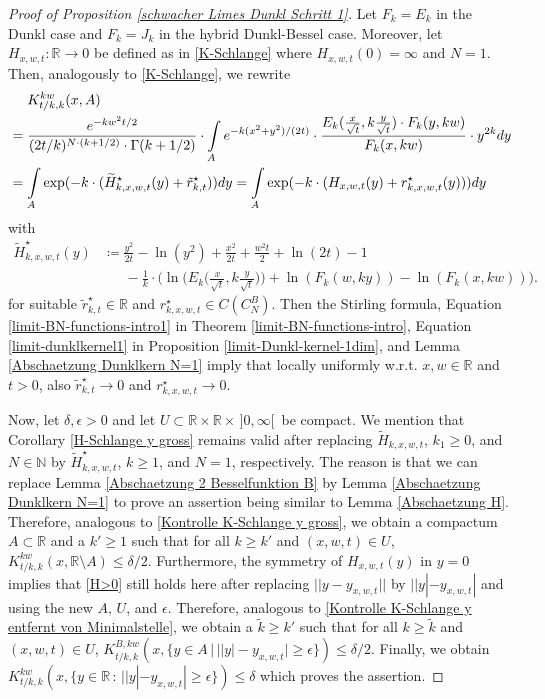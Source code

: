 \documentclass[reqno]{amsart}
\theoremstyle{plain}
\theoremstyle{definition}
\numberwithin{equation}{section}
\newcommand{\R}{\mathbb{R}}
\newcommand{\N}{\mathbb{N}}
\begin{document}
\begin{proof}[Proof of Proposition \ref{schwacher Limes Dunkl Schritt 1}]
Let $F_k=E_k$ in the Dunkl case and $F_k=J_k$ in the hybrid Dunkl-Bessel case.
Moreover, let $H_{x,w,t}:\R \to 0$ be defined as in \eqref{K-Schlange} where $H_{x,w,t}(0)=\infty$ and $N=1$.
Then, analogously to \eqref{K-Schlange}, we rewrite
\begin{align}
&\>\>\>\>\>\>K_{t/k,k}^{kw}(x,A) \notag \\
&=\frac{e^{-kw^2 t/2}}{(2t/k)^{N \cdot (k + 1/2)} \cdot \Gamma(k + 1/2)}
\cdot \int\limits_A e^{-k(x^2+y^2)/(2t)} \cdot \frac{E_k(\frac{x}{\sqrt t},k\frac{y}{\sqrt{t}}) \cdot F_k(y,kw)}{F_k(x,kw)} \cdot y^{2k} dy \notag\\ 
&=\int\limits_A \exp( -k \cdot (  \widetilde{H}^{\star}_{k,x,w,t}(y) + \tilde{r}^{\star}_{k,t} ) ) dy 
=\int\limits_A \exp( -k \cdot ( H_{x,w,t}(y) + r^{\star}_{k,x,w,t}(y) ) ) dy \label{K-Schlange Dunkl}
\end{align} 
with
\begin{align*}
\widetilde{H}^{\star}_{k,x,w,t}(y) &\coloneqq \frac{y^2}{2t} - \ln(y^2)+\frac{x^2}{2t}+\frac{w^2t}{2}+\ln(2t)-1 \\ 
&\>\>\>\>\>\>\>-\frac{1}{k} \cdot \Big( \ln\Big( E_k \Big( \frac{x}{\sqrt{t}},k\frac{y}{\sqrt{t}} \Big) \Big) + \ln( F_k(w,ky)) - \ln( F_k(x,kw)) \Big).
\end{align*}
for suitable $\tilde{r}^{\star}_{k,t} \in \R$ and $r^{\star}_{k,x,w,t} \in C(C_N^B)$.
Then the Stirling formula, Equation \eqref{limit-BN-functions-intro1} in Theorem \ref{limit-BN-functions-intro},
Equation \eqref{limit-dunklkernel1} in Proposition \ref{limit-Dunkl-kernel-1dim}, and Lemma \ref{Abschaetzung Dunklkern N=1} imply
that locally uniformly w.r.t. $x,w \in \R$ and $t>0$, 
also $\tilde{r}^{\star}_{k,t} \to 0$ and $r^{\star}_{k,x,w,t} \to 0$.

Now, let $\delta, \epsilon>0$ and let $U \subset \R \times \R \times \,]0,\infty[\,$ be compact.
We mention that Corollary \ref{H-Schlange y gross} remains valid
after replacing $\widetilde{H}_{k,x,w,t}$, $k_1 \geq 0$, and $N \in \N$ by $\widetilde{H}^{\star}_{k,x,w,t}$, $k \geq 1$, and $N=1$, respectively.
The reason is that we can replace Lemma \ref{Abschaetzung 2 Besselfunktion B} by Lemma \ref{Abschaetzung Dunklkern N=1}
to prove an assertion being similar to Lemma \ref{Abschaetzung H}.
Therefore, analogous to \eqref{Kontrolle K-Schlange y gross}, we obtain a compactum $A \subset \R$ and a $k' \geq 1$ such that
for all $k \geq k'$ and $(x,w,t) \in U$,
$K_{t/k,k}^{k w}(x,\R \setminus A) \leq \delta/2.$
Furthermore, the symmetry of $H_{x,w,t}(y)$ in $y=0$ implies that \eqref{H>0} still holds here
after replacing $||y-y_{x,w,t}||$ by $||y|-y_{x,w,t}|$ and using the new $A$, $U$, and $\epsilon$.
Therefore, analogous to \eqref{Kontrolle K-Schlange y entfernt von Minimalstelle}, we obtain a $\widetilde{k} \geq k'$ 
such that for all $k \geq \widetilde{k}$ and $(x,w,t) \in U$, 
$K_{t/k,k}^{B,k w}(x,\{y \in A \, | \, ||y|-y_{x,w,t}| \geq \epsilon \}) \leq \delta/2.$
Finally, we obtain $K_{t/k,k}^{kw}(x,\{y \in \R \, : \, ||y|-y_{x,w,t}| \geq \epsilon\}) \leq \delta$
which proves the assertion.
\end{proof}
\end{document}
